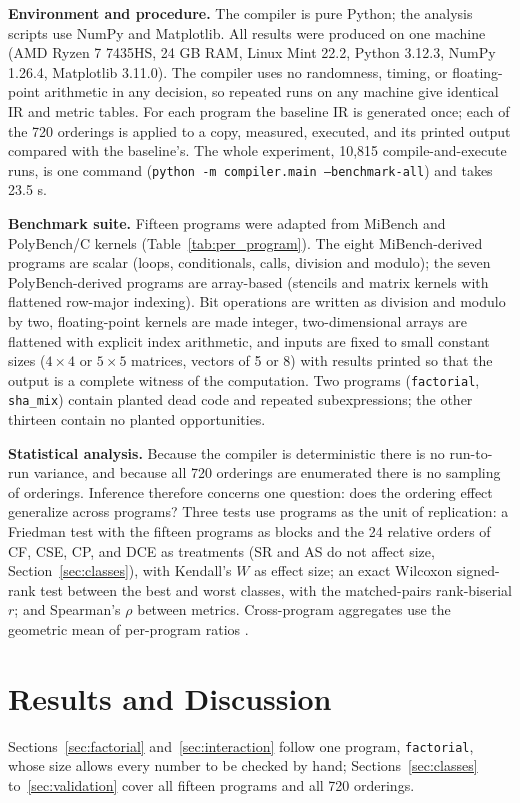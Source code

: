 \documentclass[conference,a4paper]{IEEEtran}
\begin{document}
\textbf{Environment and procedure.} The compiler is pure Python; the analysis scripts use NumPy and Matplotlib. All results were produced on one machine (AMD Ryzen 7 7435HS, 24 GB RAM, Linux Mint 22.2, Python 3.12.3, NumPy 1.26.4, Matplotlib 3.11.0). The compiler uses no randomness, timing, or floating-point arithmetic in any decision, so repeated runs on any machine give identical IR and metric tables. For each program the baseline IR is generated once; each of the 720 orderings is applied to a copy, measured, executed, and its printed output compared with the baseline's. The whole experiment, 10,815 compile-and-execute runs, is one command (\texttt{python -m compiler.main --benchmark-all}) and takes 23.5 s.

\textbf{Benchmark suite.} Fifteen programs were adapted from MiBench \cite{ref32} and PolyBench/C \cite{ref31} kernels (Table~\ref{tab:per_program}). The eight MiBench-derived programs are scalar (loops, conditionals, calls, division and modulo); the seven PolyBench-derived programs are array-based (stencils and matrix kernels with flattened row-major indexing). Bit operations are written as division and modulo by two, floating-point kernels are made integer, two-dimensional arrays are flattened with explicit index arithmetic, and inputs are fixed to small constant sizes ($4\times4$ or $5\times5$ matrices, vectors of 5 or 8) with results printed so that the output is a complete witness of the computation. Two programs (\texttt{factorial}, \texttt{sha\_mix}) contain planted dead code and repeated subexpressions; the other thirteen contain no planted opportunities.

\textbf{Statistical analysis.} Because the compiler is deterministic there is no run-to-run variance, and because all 720 orderings are enumerated there is no sampling of orderings. Inference therefore concerns one question: does the ordering effect generalize across programs? Three tests use programs as the unit of replication: a Friedman test with the fifteen programs as blocks and the 24 relative orders of CF, CSE, CP, and DCE as treatments (SR and AS do not affect size, Section~\ref{sec:classes}), with Kendall's $W$ as effect size; an exact Wilcoxon signed-rank test between the best and worst classes, with the matched-pairs rank-biserial $r$; and Spearman's $\rho$ between metrics. Cross-program aggregates use the geometric mean of per-program ratios \cite{ref33}.

\section{Results and Discussion}
Sections~\ref{sec:factorial} and~\ref{sec:interaction} follow one program, \texttt{factorial}, whose size allows every number to be checked by hand; Sections~\ref{sec:classes} to~\ref{sec:validation} cover all fifteen programs and all 720 orderings.
\end{document}
